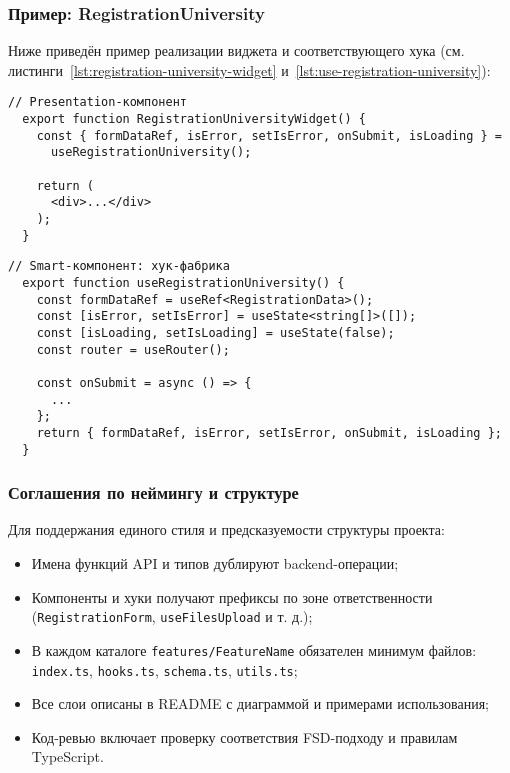 \subsubsection{Пример: RegistrationUniversity}

Ниже приведён пример реализации виджета и соответствующего хука (см. листинги~\ref{lst:registration-university-widget} и~\ref{lst:use-registration-university}):

\begin{lstlisting}[breaklines=true,caption=RegistrationUniversityWidget,label=lst:registration-university-widget]
  // Presentation-компонент
  export function RegistrationUniversityWidget() {
    const { formDataRef, isError, setIsError, onSubmit, isLoading } =
      useRegistrationUniversity();

    return (
      <div>...</div>
    );
  }
\end{lstlisting}

\begin{lstlisting}[breaklines=true,caption=useRegistrationUniversity,label=lst:use-registration-university]
  // Smart-компонент: хук-фабрика
  export function useRegistrationUniversity() {
    const formDataRef = useRef<RegistrationData>();
    const [isError, setIsError] = useState<string[]>([]);
    const [isLoading, setIsLoading] = useState(false);
    const router = useRouter();

    const onSubmit = async () => {
      ...
    };
    return { formDataRef, isError, setIsError, onSubmit, isLoading };
  }
\end{lstlisting}

\subsubsection{Соглашения по неймингу и структуре}

Для поддержания единого стиля и предсказуемости структуры проекта:
\begin{itemize}
  \item Имена функций API и типов дублируют backend-операции;
  \item Компоненты и хуки получают префиксы по зоне ответственности (\texttt{RegistrationForm}, \texttt{useFilesUpload} и т. д.);
  \item В каждом каталоге \texttt{features/FeatureName} обязателен минимум файлов: \texttt{index.ts}, \texttt{hooks.ts}, \texttt{schema.ts}, \texttt{utils.ts};
  \item Все слои описаны в README с диаграммой и примерами использования;
  \item Код-ревью включает проверку соответствия FSD-подходу и правилам TypeScript.
\end{itemize}

